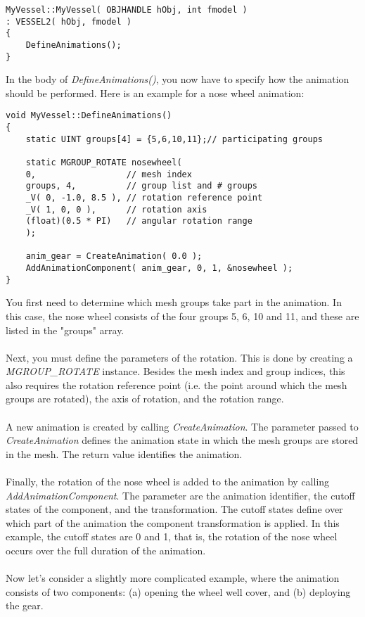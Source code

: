 \documentclass[Orbiter Developer Manual.tex]{subfiles}
\begin{document}
\begin{lstlisting}
MyVessel::MyVessel( OBJHANDLE hObj, int fmodel )
: VESSEL2( hObj, fmodel )
{
	DefineAnimations();
}
\end{lstlisting}

\noindent
In the body of \textit{DefineAnimations()}, you now have to specify how the animation should be performed. Here is an example for a nose wheel animation:

\begin{lstlisting}
void MyVessel::DefineAnimations()
{
	static UINT groups[4] = {5,6,10,11};// participating groups

	static MGROUP_ROTATE nosewheel(
	0,					// mesh index
	groups, 4,			// group list and # groups
	_V( 0, -1.0, 8.5 ),	// rotation reference point
	_V( 1, 0, 0 ),		// rotation axis
	(float)(0.5 * PI)	// angular rotation range
	);

	anim_gear = CreateAnimation( 0.0 );
	AddAnimationComponent( anim_gear, 0, 1, &nosewheel );
}
\end{lstlisting}

\noindent
You first need to determine which mesh groups take part in the animation. In this case, the nose wheel consists of the four groups 5, 6, 10 and 11, and these are listed in the "groups" array.\\
\\
Next, you must define the parameters of the rotation. This is done by creating a \textit{MGROUP\_ROTATE} instance. Besides the mesh index and group indices, this also requires the rotation reference point (i.e. the point around which the mesh groups are rotated), the axis of rotation, and the rotation range.\\
\\
A new animation is created by calling \textit{CreateAnimation}. The parameter passed to \textit{CreateAnimation} defines the animation state in which the mesh groups are stored in the mesh. The return value identifies the animation.\\
\\
Finally, the rotation of the nose wheel is added to the animation by calling \textit{AddAnimationComponent}. The parameter are the animation identifier, the cutoff states of the component, and the transformation. The cutoff states define over which part of the animation the component transformation is applied. In this example, the cutoff states are 0 and 1, that is, the rotation of the nose wheel occurs over the full duration of the animation.\\
\\
Now let's consider a slightly more complicated example, where the animation consists of two components: (a) opening the wheel well cover, and (b) deploying the gear.
\end{document}
